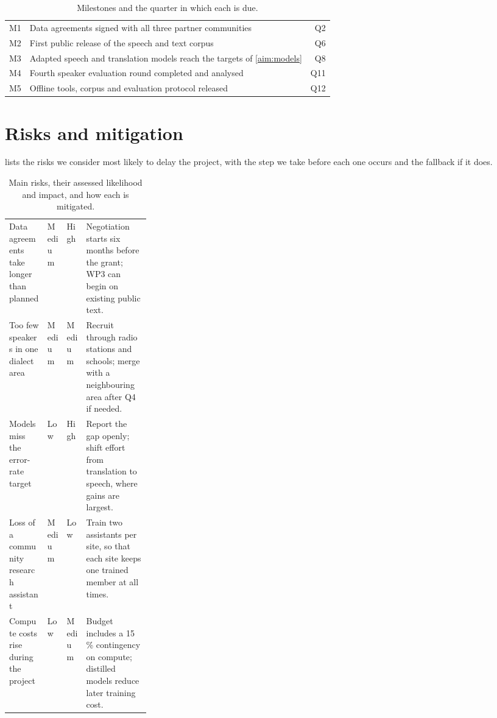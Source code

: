 \documentclass[11pt]{article}
\begin{document}
\begin{table}[H]
\centering\tablefont
\caption{Milestones and the quarter in which each is due.}\label{tab:milestones}
\begin{tabularx}{\linewidth}{@{}l L r@{}}
  \toprule
   &  &  \\
  \midrule
  M1 & Data agreements signed with all three partner communities & Q2 \\
  M2 & First public release of the speech and text corpus & Q6 \\
  M3 & Adapted speech and translation models reach the targets of \cref{aim:models} & Q8 \\
  M4 & Fourth speaker evaluation round completed and analysed & Q11 \\
  M5 & Offline tools, corpus and evaluation protocol released & Q12 \\
  \bottomrule
\end{tabularx}
\end{table}

\section{Risks and mitigation}\label{sec:risks}

 lists the risks we consider most likely to delay the
project, with the step we take before each one occurs and the fallback if it
does.

\begin{table}[H]
\centering\tablefont
\caption{Main risks, their assessed likelihood and impact, and how each is
mitigated.}\label{tab:risks}
\begin{tabularx}{\linewidth}{@{}>{\raggedright\arraybackslash}p{0.27\linewidth}
    l l L@{}}
  \toprule
   &  &  &  \\
  \midrule
  Data agreements take longer than planned & Medium & High &
    Negotiation starts six months before the grant; WP3 can begin on
    existing public text. \\
  Too few speakers in one dialect area & Medium & Medium &
    Recruit through radio stations and schools; merge with a neighbouring
    area after Q4 if needed. \\
  Models miss the error-rate target & Low & High &
    Report the gap openly; shift effort from translation to speech, where
    gains are largest. \\
  Loss of a community research assistant & Medium & Low &
    Train two assistants per site, so that each site keeps one trained
    member at all times. \\
  Compute costs rise during the project & Low & Medium &
    Budget includes a 15\,\% contingency on compute; distilled models
    reduce later training cost. \\
  \bottomrule
\end{tabularx}
\end{table}
\end{document}
